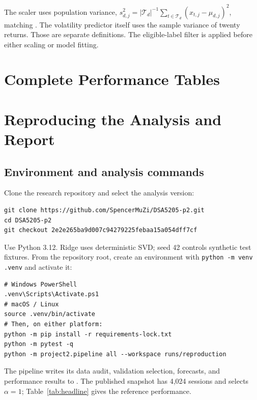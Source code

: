 \begin{table}[!htbp]
\centering\small
\caption{Selected records from the monthly fit audit.}
\label{tab:fitchecks}

\end{table}

The scaler uses population variance, $s_{d,j}^2=|\mathcal T_d|^{-1}\sum_{t\in\mathcal T_d}(x_{t,j}-\mu_{d,j})^2$, matching . The volatility predictor itself uses the sample variance of twenty returns. Those are separate definitions. The eligible-label filter is applied before either scaling or model fitting.
\FloatBarrier

\section{Complete Performance Tables}
\label{app:fullresults}
\begin{table}[!htbp]
\centering\small
\caption{Cost sensitivity for all three fixed position paths.}
\label{tab:fullcosts}

\end{table}

\begin{table}[!htbp]
\centering\small
\caption{Annual net return, risk, and participation at 5 bps.}
\label{tab:fullyears}

\end{table}
\FloatBarrier

\section{Reproducing the Analysis and Report}
\label{app:reproduction}
\subsection{Environment and analysis commands}
Clone the research repository and select the analysis version:
\begin{lstlisting}
git clone https://github.com/SpencerMuZi/DSA5205-p2.git
cd DSA5205-p2
git checkout 2e2e265ba9d007c94279225febaa15a054dff7cf
\end{lstlisting}
Use Python 3.12. Ridge uses deterministic SVD; seed 42 controls synthetic test fixtures. From the repository root, create an environment with \texttt{python -m venv .venv} and activate it:
\begin{lstlisting}
# Windows PowerShell
.venv\Scripts\Activate.ps1
# macOS / Linux
source .venv/bin/activate
# Then, on either platform:
python -m pip install -r requirements-lock.txt
python -m pytest -q
python -m project2.pipeline all --workspace runs/reproduction
\end{lstlisting}
The pipeline writes its data audit, validation selection, forecasts, and performance results to . The published snapshot has 4,024 sessions and selects $\alpha=1$; Table~\ref{tab:headline} gives the reference performance.

